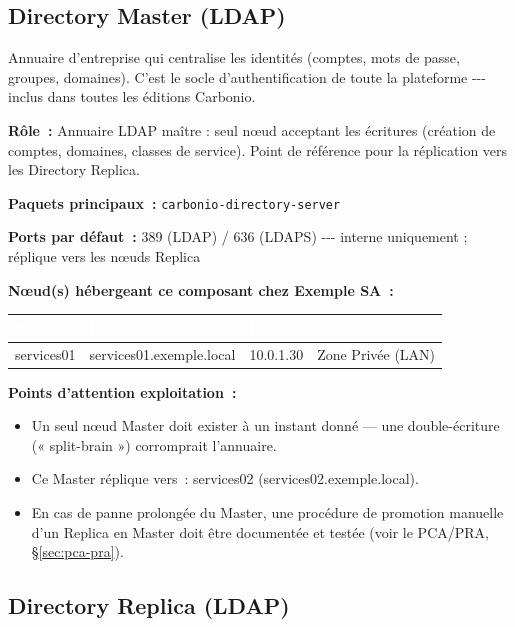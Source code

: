 \documentclass[11pt,a4paper]{report}
\newcommand{\tblhead}[1]{\textcolor{white}{\textbf{#1}}}
\begin{document}
\subsection{Directory Master (LDAP)}

Annuaire d'entreprise qui centralise les identités (comptes, mots de passe, groupes, domaines).\allowbreak{} C'est le socle d'authentification de toute la plateforme -\allowbreak{}-\allowbreak{}-\allowbreak{} inclus dans toutes les éditions Carbonio.\allowbreak{}

\textbf{Rôle~:} Annuaire LDAP maître : seul nœud acceptant les écritures (création de comptes, domaines, classes de service).\allowbreak{} Point de référence pour la réplication vers les Directory Replica.\allowbreak{}


\textbf{Paquets principaux~:} \texttt{carbonio-\allowbreak{}directory-\allowbreak{}server}

\textbf{Ports par défaut~:} 389 (LDAP) / 636 (LDAPS) -\allowbreak{}-\allowbreak{}-\allowbreak{} interne uniquement ; réplique vers les nœuds Replica

\textbf{Nœud(s) hébergeant ce composant chez Exemple SA~:}
\begin{longtable}{|p{3.2cm}|p{4.5cm}|p{3.2cm}|p{2.3cm}|}
\hline
\rowcolor{primary}\tblhead{Nœud} & \tblhead{Hostname} & \tblhead{IP} & \tblhead{Zone} \\
\hline
\endhead
services01 & services01.\allowbreak{}exemple.\allowbreak{}local & 10.\allowbreak{}0.\allowbreak{}1.\allowbreak{}30 & Zone Privée (LAN) \\
\hline
\end{longtable}

\textbf{Points d'attention exploitation~:}
\begin{itemize}[nosep]
  \item Un seul nœud Master doit exister à un instant donné --- une double-écriture (« split-brain ») corromprait l'annuaire.
  \item Ce Master réplique vers~: services02 (services02.\allowbreak{}exemple.\allowbreak{}local).
  \item En cas de panne prolongée du Master, une procédure de promotion manuelle d'un Replica en Master doit être documentée et testée (voir le PCA/PRA, \S\ref{sec:pca-pra}).
\end{itemize}

\subsection{Directory Replica (LDAP)}
\end{document}
